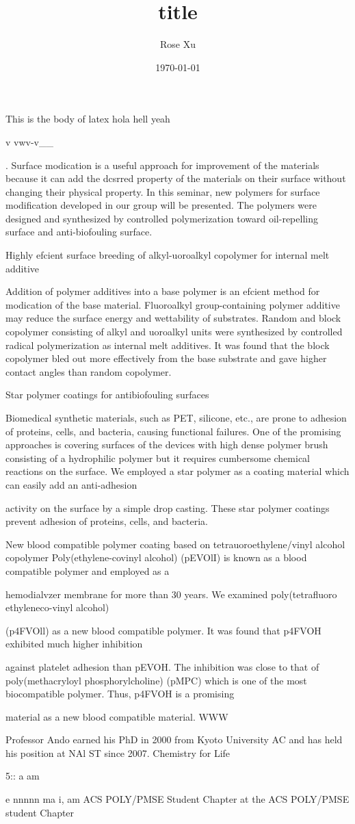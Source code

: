 \documentclass[12pt]{article}
\title{title}
\author{Rose Xu}
\date{\today}
\begin{document}
\maketitle

This is the body of latex hola hell yeah

v
vwv-v__

. Surface modication is a useful approach for improvement of the materials because it can add the
dcsrred property of the materials on their surface without changing their physical property. In this seminar, new
polymers for surface modification developed in our group will be presented. The polymers were designed and
synthesized by controlled polymerization toward oil-repelling surface and anti-biofouling surface.

Highly efcient surface breeding of alkyl-uoroalkyl copolymer for internal melt additive

Addition of polymer additives into a base polymer is an efcient method for modication of the base
material. Fluoroalkyl group-containing polymer additive may reduce the surface energy and wettability of
substrates. Random and block copolymer consisting of alkyl and uoroalkyl units were synthesized by
controlled radical polymerization as internal melt additives. It was found that the block copolymer bled out
more effectively from the base substrate and gave higher contact angles than random copolymer.

Star polymer coatings for antibiofouling surfaces

Biomedical synthetic materials, such as PET, silicone, etc., are prone to adhesion of proteins, cells, and
bacteria, causing functional failures. One of the promising approaches is covering surfaces of the devices with
high dense polymer brush consisting of a hydrophilic polymer but it requires cumbersome chemical reactions
on the surface. We employed a star polymer as a coating material which can easily add an anti-adhesion

activity on the surface by a simple drop casting. These star polymer coatings prevent adhesion of proteins,
cells, and bacteria.

New blood compatible polymer coating based on tetrauoroethylene/vinyl alcohol copolymer
Poly(ethylene-covinyl alcohol) (pEVOlI) is known as a blood compatible polymer and employed as a

hemodialvzer membrane for more than 30 years. We examined poly(tetrafluoro ethyleneco-vinyl alcohol)

(p4FVOll) as a new blood compatible polymer. It was found that p4FVOH exhibited much higher inhibition

against platelet adhesion than pEVOH. The inhibition was close to that of poly(methacryloyl
phosphorylcholine) (pMPC) which is one of the most biocompatible polymer. Thus, p4FVOH is a promising

material as a new blood compatible material. WWW

Professor Ando earned his PhD in 2000 from Kyoto University AC
and has held his position at NAl ST since 2007. Chemistry for Life

 

5:: a am

e nnnnn ma i, am ACS POLY/PMSE Student Chapter at the ACS POLY/PMSE student Chapter
\end{document}
